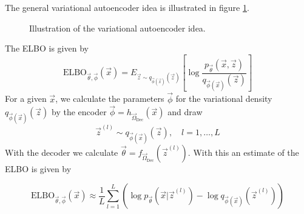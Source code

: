
The general variational autoencoder idea is illustrated in figure \ref{fig:vae}.

\begin{figure}[!htb]
    \centering
    
    \caption{Illustration of the variational autoencoder idea.}
    \label{fig:vae}
\end{figure}

The ELBO is given by
\begin{equation}
    \text{ELBO}_{\vec{\theta}, \vec{\phi}}(\vec{x}) = E_{\vec{z} \sim q_{\vec{\phi}(\vec{x})}(\vec{z})} \left[ \log \frac{p_\vec{\theta}(\vec{x},\vec{z})}{q_{\vec{\phi}(\vec{x})}(\vec{z})} \right]
\end{equation}
For a given $\vec{x}$, we calculate the parameters $\vec{\phi}$ for the variational density $q_{\vec{\phi}(\vec{x})}(\vec{z})$ by the encoder
${\vec{\phi}} = h_{\vec{\Omega}_{\text{Dec}}}(\vec{x})$ and draw
\begin{equation}
    \vec{z}^{(l)} \sim q_{\vec{\phi}(\vec{x})}(\vec{z}), \quad l = 1,\dots,L
\end{equation}
With the decoder we calculate $\vec{\theta} = f_{\vec{\Omega}_{\text{Dec}}}(\vec{z}^{(l)})$. With this 
an estimate of the ELBO is given by

\begin{equation}
    \text{ELBO}_{\vec{\theta}, \vec{\phi}}(\vec{x}) \approx \frac{1}{L} \sum_{l=1}^{L} \left(\log p_{\vec{\theta}}(\vec{x}|\vec{z}^{(l)}) - \log q_{\vec{\phi}(\vec{x})}(\vec{z}^{(l)})\right)
\end{equation}


